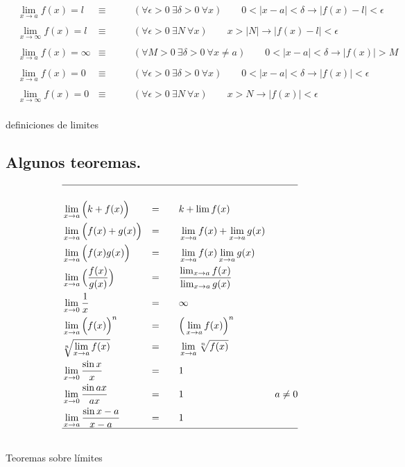 \documentclass[14pt,a4paper]{extarticle}
\begin{document}
\begin{table}[!htbp]

\begin{align*}
&\lim_{x \to a}f(x) = l  &  \equiv \qquad  &
( \forall \epsilon > 0 \ \exists \delta > 0 \ \forall x)  \qquad   0<|x-a|< \delta  \to  |f(x) - l| <
\epsilon  & \\
\\
&\lim_{x \to \infty}f(x) = l  &  \equiv  \qquad &
(\forall \epsilon > 0 \ \exists N \ \forall x) \qquad  x > |N|  \to
 |f(x) - l| < \epsilon & \\
\\
&\lim_{x \to a}f(x) = \infty  &  \equiv \qquad  &
(\forall M > 0 \ \exists \delta > 0 \ \forall x \neq a) \qquad   0<|x-a| < \delta  \to  |f(x)| >
M  & \\
\\
&\lim_{x \to a}f(x) = 0  &  \equiv   \qquad  &
(\forall \epsilon > 0 \ \exists \delta > 0 \ \forall x) \qquad   0<|x-a| < \delta  \to  |f(x)| <
\epsilon & \\
\\
&\lim_{x \to \infty}f(x) = 0  &  \equiv \qquad  &
(\forall \epsilon > 0 \ \exists N \ \forall x) \qquad   x > N  \to
 |f(x)| < \epsilon & \\
\end{align*}
\caption{definiciones de limites}
\label{tab:limDef}
\end{table}


\subsection{Algunos teoremas.}
\begin{table}[!htbp]
{\renewcommand{\arraystretch}{1.2}
\begin{align*}
\hline \\
& \lim_{x \to a} \Big(k + f(x)\Big) & =  \qquad & k + \lim f(x)& \\
& \lim_{x \to a}\Big(f(x) + g(x)\Big) & =   \qquad  &   \lim_{x \to a}f(x) + \lim_{x  \to a} g(x)&  \\
& \lim_{x \to a}\Big(f(x) g(x)\Big) & =   \qquad  &   \lim_{x \to a}f(x) \lim_{x  \to a} g(x)&  \\
& \lim_{x \to a}\Big(\frac{f(x)}{g(x)}\Big) & =   \qquad  &\frac{\lim_{x \to a}f(x) }{\lim_{x  \to a} g(x)} &  \\
& \lim_{x \to 0}\frac{1}{x} & =   \qquad  & \infty & \\
& \lim_{x \to a}\Big(f(x)\Big)^n & = \qquad & \Big(\lim_{x \to  a}f(x)\Big)^n & \\
& \sqrt[n]{\lim_{x \to a}f(x)} & = \qquad & \lim_{x \to
  a}\sqrt[n]{f(x)} & \\
& \lim_{x \to 0}\frac{\sin{x}}{x} & = \qquad & 1 & \\
& \lim_{x \to 0}\frac{\sin{ax}}{ax} & = \qquad & 1 & a \neq 0 \\
& \lim_{x \to a}\frac{\sin{x-a}}{x-a} & = \qquad & 1 & \\
\hline \\
\end{align*}
}
\caption{Teoremas sobre l\'imites}
\label{tab:limReg}
\end{table}
\end{document}

